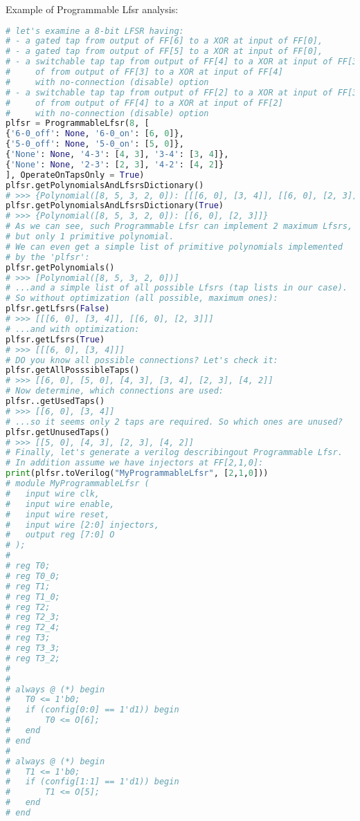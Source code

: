 \label{programmablelfsrexample}
Example of Programmable Lfsr analysis:
\begin{lstlisting}[language=Python]
# let's examine a 8-bit LFSR having:
# - a gated tap from output of FF[6] to a XOR at input of FF[0], 
# - a gated tap from output of FF[5] to a XOR at input of FF[0], 
# - a switchable tap tap from output of FF[4] to a XOR at input of FF[3]
#     of from output of FF[3] to a XOR at input of FF[4]
#     with no-connection (disable) option
# - a switchable tap tap from output of FF[2] to a XOR at input of FF[3]
#     of from output of FF[4] to a XOR at input of FF[2]
#     with no-connection (disable) option
plfsr = ProgrammableLfsr(8, [
{'6-0_off': None, '6-0_on': [6, 0]},
{'5-0_off': None, '5-0_on': [5, 0]},
{'None': None, '4-3': [4, 3], '3-4': [3, 4]},
{'None': None, '2-3': [2, 3], '4-2': [4, 2]}
], OperateOnTapsOnly = True)
plfsr.getPolynomialsAndLfsrsDictionary()
# >>> {Polynomial([8, 5, 3, 2, 0]): [[[6, 0], [3, 4]], [[6, 0], [2, 3]]]}
plfsr.getPolynomialsAndLfsrsDictionary(True)
# >>> {Polynomial([8, 5, 3, 2, 0]): [[6, 0], [2, 3]]}
# As we can see, such Programmable Lfsr can implement 2 maximum Lfsrs,
# but only 1 primitive polynomial.
# We can even get a simple list of primitive polynomials implemented
# by the 'plfsr':
plfsr.getPolynomials()
# >>> [Polynomial([8, 5, 3, 2, 0])]
# ...and a simple list of all possible Lfsrs (tap lists in our case).
# So without optimization (all possible, maximum ones):
plfsr.getLfsrs(False)
# >>> [[[6, 0], [3, 4]], [[6, 0], [2, 3]]]
# ...and with optimization:
plfsr.getLfsrs(True)
# >>> [[[6, 0], [3, 4]]]
# DO you know all possible connections? Let's check it:
plfsr.getAllPosssibleTaps()
# >>> [[6, 0], [5, 0], [4, 3], [3, 4], [2, 3], [4, 2]]
# Now determine, which connections are used:
plfsr..getUsedTaps()
# >>> [[6, 0], [3, 4]]
# ...so it seems only 2 taps are required. So which ones are unused?
plfsr.getUnusedTaps()
# >>> [[5, 0], [4, 3], [2, 3], [4, 2]]
# Finally, let's generate a verilog describingout Programmable Lfsr.
# In addition assume we have injectors at FF[2,1,0]:
print(plfsr.toVerilog("MyProgrammableLfsr", [2,1,0]))
# module MyProgrammableLfsr (
# 	input wire clk,
# 	input wire enable,
# 	input wire reset,
# 	input wire [2:0] injectors,
# 	output reg [7:0] O
# );
# 
# reg T0;
# reg T0_0;
# reg T1;
# reg T1_0;
# reg T2;
# reg T2_3;
# reg T2_4;
# reg T3;
# reg T3_3;
# reg T3_2;
# 
# 
# always @ (*) begin
# 	T0 <= 1'b0;
# 	if (config[0:0] == 1'd1)) begin
# 		T0 <= O[6];
# 	end
# end
# 
# always @ (*) begin
# 	T1 <= 1'b0;
# 	if (config[1:1] == 1'd1)) begin
# 		T1 <= O[5];
# 	end
# end


\end{lstlisting}
